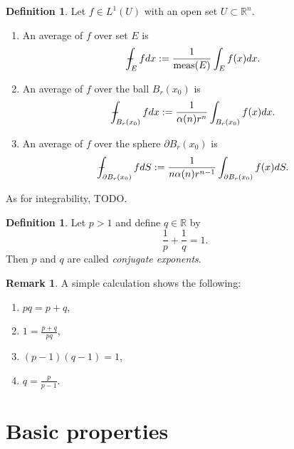 \documentclass[11pt,a4paper]{report}
\theoremstyle{definition}
\newtheorem{definition}[theorem]{Definition}
\newtheorem{remark}[theorem]{Remark}
\def\Xint#1{\mathchoice
{\XXint\displaystyle\textstyle{#1}}%
{\XXint\textstyle\scriptstyle{#1}}%
{\XXint\scriptstyle\scriptscriptstyle{#1}}%
{\XXint\scriptscriptstyle\scriptscriptstyle{#1}}%
\!\int}
\def\XXint#1#2#3{{\setbox0=\hbox{$#1{#2#3}{\int}$}
\vcenter{\hbox{$#2#3$}}\kern-.5\wd0}}
\def\dashint{\Xint-}
\begin{document}
\begin{definition}
	Let $f \in L^1(U)$ with an open set $U \subset \mathbb{R}^{n}$.
	\begin{enumerate}[label=(\alph*)] 
	\rm\item An average of $f$ over set $E$ is 
	\begin{equation*} 
		\dashint_{E} f d x:=\frac{1}{\operatorname{meas}(E)} \int_{E} f(x) d x.
	\end{equation*}
	\rm\item An average of $f$ over the ball $B_r(x_0)$ is 
	\begin{equation*} 
		\dashint_{B_r(x_0)} f d x:= \frac{1}{\alpha(n) r^{n}} \int_{B_r(x_0)} f(x) d x.
	\end{equation*}
	\rm\item An average of $f$ over the sphere $\partial B_r(x_0)$ is 
	\begin{equation*} 
		\dashint_{\partial B_r(x_0)} f d S :=\frac{1}{n\alpha(n) r^{n-1}} \int_{\partial B_r(x_0)} f(x) d S.
	\end{equation*}
	\end{enumerate}
\end{definition}

As for integrability, TODO.

\begin{definition}
    Let $p>1$ and define $q \in \mathbb{R}$ by 
    \begin{equation*} 
        \frac{1}{p} + \frac{1}{q} = 1.
    \end{equation*}
    Then $p$ and $q$ are called \emph{conjugate exponents}.
\end{definition}

\begin{remark}
    A simple calculation shows the following:
    \begin{enumerate}[label=(\roman*)] 
    \rm\item $pq = p + q$,
    \rm\item $\displaystyle 1 = \frac{p+q}{pq}$,
    \rm\item $(p-1)(q-1)=1$,
    \rm\item $\displaystyle q= \frac{p}{p-1}$.
    \end{enumerate}
\end{remark}

\chapter{Basic properties}
\end{document}
